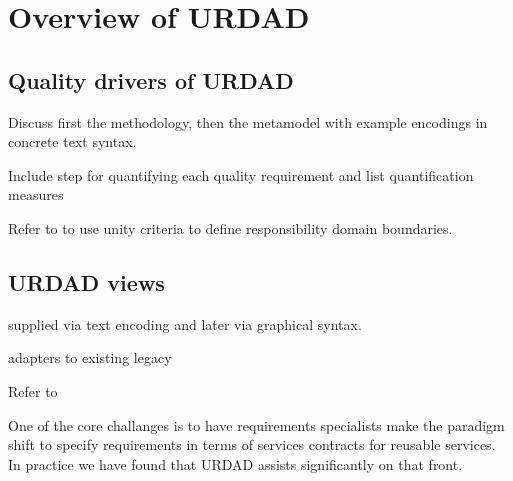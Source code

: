 \section{Overview of URDAD}

\subsection{Quality drivers of URDAD}

Discuss first the methodology, then the metamodel with example encodings in concrete text syntax.


Include step for quantifying each quality requirement and list quantification measures

Refer to \cite{gonzalez_unity_2009} to use unity criteria to define responsibility domain boundaries.


\subsection{URDAD views}

supplied via text encoding and later via graphical syntax.


adapters to existing legacy


Refer to \cite{wirfs-brock_object-oriented_1989}

One of the core challanges is to have requirements specialists make the paradigm shift to specify requirements in terms of services contracts for reusable services\cite{haines_impact_2007}. In practice we have found that URDAD assists significantly on that front.
